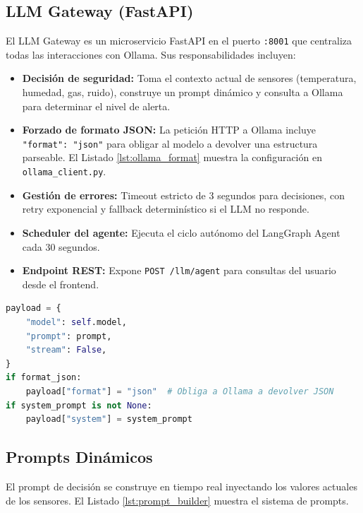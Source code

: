 \documentclass[12pt,letterpaper]{article}
\begin{document}
\subsection{LLM Gateway (FastAPI)}

El LLM Gateway es un microservicio FastAPI en el puerto \mbox{\texttt{:8001}} que centraliza todas las interacciones con Ollama. Sus responsabilidades incluyen:

\begin{itemize}
    \item \textbf{Decisión de seguridad:} Toma el contexto actual de sensores (temperatura, humedad, gas, ruido), construye un prompt dinámico y consulta a Ollama para determinar el nivel de alerta.
    \item \textbf{Forzado de formato JSON:} La petición HTTP a Ollama incluye \mbox{\texttt{"format": "json"}} para obligar al modelo a devolver una estructura parseable. El Listado \ref{lst:ollama_format} muestra la configuración en \mbox{\texttt{ollama\_client.py}}.
    \item \textbf{Gestión de errores:} Timeout estricto de 3 segundos para decisiones, con retry exponencial y fallback determinístico si el LLM no responde.
    \item \textbf{Scheduler del agente:} Ejecuta el ciclo autónomo del LangGraph Agent cada 30 segundos.
    \item \textbf{Endpoint REST:} Expone \mbox{\texttt{POST /llm/agent}} para consultas del usuario desde el frontend.
\end{itemize}

\begin{lstlisting}[language=Python, label=lst:ollama_format, caption={Forzado de formato JSON en las peticiones a Ollama.}]
payload = {
    "model": self.model,
    "prompt": prompt,
    "stream": False,
}
if format_json:
    payload["format"] = "json"  # Obliga a Ollama a devolver JSON
if system_prompt is not None:
    payload["system"] = system_prompt
\end{lstlisting}

\subsection{Prompts Dinámicos}

El prompt de decisión se construye en tiempo real inyectando los valores actuales de los sensores. El Listado \ref{lst:prompt_builder} muestra el sistema de prompts.
\end{document}
